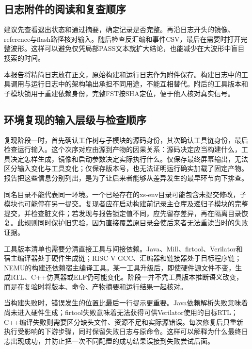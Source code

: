 \subsection{日志附件的阅读和复查顺序}


建议先查看退出状态和通过摘要，确定记录是否完整。再沿日志开头的镜像、reference与flash路径核对输入。随后检查反汇编和事件CSV，最后在需要时打开完整波形。这样可以避免仅凭局部PASS文本就扩大结论，也能减少在大波形中盲目搜索的时间。\par


本报告将精简日志放在正文，原始构建和运行日志作为附件保存。构建日志中的工具调用与运行日志中的架构输出承担不同用途，不能互相替代。附后的工具版本和子模块锁用于重建依赖身份，完整FST按SHA定位，便于他人核对真实信号。\par


\subsection{环境复现的输入层级与检查顺序}


复现阶段一时，首先确认工作树与子模块的源码身份，其次确认工具链身份，最后检查运行输入。这个次序对应由源到产物的因果关系：源码决定应当构建什么，工具决定怎样生成，镜像和启动参数决定实际执行什么。仅保存最终屏幕输出，无法区分输入变化与工具变化；仅保存版本号，也无法证明运行确实加载了固定产物。报告把这些信息分别列出，是为了让后来者能够从差异发生的最早环节向下排查。\par


同名目录不能代表同一环境。一个已经存在的xs-env目录可能包含未提交修改，子模块也可能停在另一提交。复现者应在启动构建前记录主仓库及递归子模块的完整提交，并检查脏文件；若发现与报告锁定值不同，应先留存差异，再在隔离目录恢复。此规则同时保护旧实验，因为直接覆盖原目录会使后来者无法重读当时的失败证据。\par


工具版本清单也需要分清直接工具与间接依赖。Java、Mill、firtool、Verilator和宿主编译器处于硬件生成链；RISC-V GCC、汇编器和链接器处于目标程序链；NEMU的构建还依赖宿主编译工具。某一工具升级后，即使硬件源文件不变，生成RTL、C++仿真器或ELF仍可能变化。阶段一并不凭工具版本推断语义改变，而是在复验时将版本、命令、产物摘要和运行结果一起核对。\par


当构建失败时，错误发生的位置比最后一行提示更重要。Java依赖解析失败意味着尚未进入硬件生成；firtool失败意味着无法获得可供Verilator使用的目标RTL；C++编译失败则需要区分缺头文件、资源不足和实际源错误。每次修复后只重新执行受影响的下游步骤，同时保留失败日志与原命令。这样可以解释为什么最终日志出现成功，并防止把一次不同配置的成功结果误接到失败尝试后面。\par


